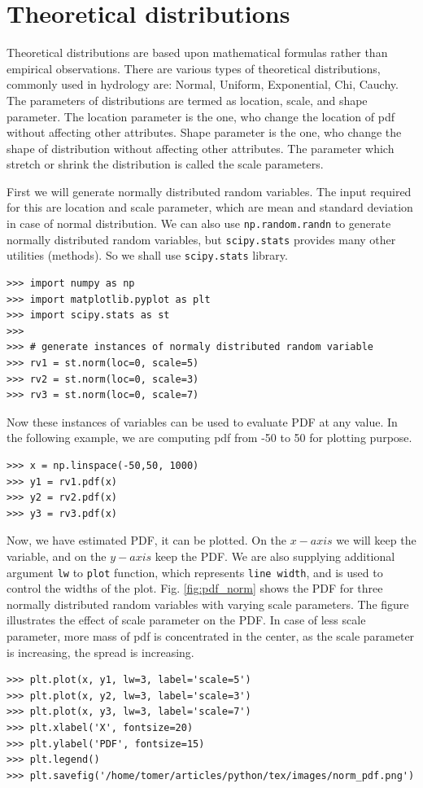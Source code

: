 \documentclass[10pt]{book}
\begin{document}
{\section{Theoretical distributions}
Theoretical distributions are based upon mathematical formulas rather than empirical observations. There are various types of theoretical distributions, commonly used in hydrology are: Normal, Uniform, Exponential, Chi, Cauchy. The parameters of distributions are termed as location, scale, and shape parameter. The location parameter is the one, who change the location of pdf without affecting other attributes. Shape parameter is the one, who change the shape of distribution  without affecting other attributes. The parameter which stretch or shrink the distribution is called the scale parameters. 

First we will generate normally distributed random variables. The input required for this are location and scale parameter, which are mean and standard deviation in case of normal distribution. We can also use \verb"np.random.randn" to generate normally distributed random variables, but \verb"scipy.stats" provides many other utilities (methods). So we shall use \verb"scipy.stats" library. 

\beforeverb \begin{verbatim}
>>> import numpy as np
>>> import matplotlib.pyplot as plt
>>> import scipy.stats as st
>>> 
>>> # generate instances of normaly distributed random variable
>>> rv1 = st.norm(loc=0, scale=5)
>>> rv2 = st.norm(loc=0, scale=3)
>>> rv3 = st.norm(loc=0, scale=7)
\end{verbatim} \afterverb
{}
Now these instances of variables can be used to evaluate PDF at any value. In the following example, we are computing pdf from -50 to 50 for plotting purpose. 

\beforeverb \begin{verbatim}
>>> x = np.linspace(-50,50, 1000)
>>> y1 = rv1.pdf(x)
>>> y2 = rv2.pdf(x)
>>> y3 = rv3.pdf(x)
\end{verbatim} \afterverb

Now, we have estimated PDF, it can be plotted. On the $x-axis$ we will keep the variable, and on the $y-axis$ keep the PDF. We are also supplying additional argument \verb"lw" to \verb"plot" function, which represents \verb"line width", and is used to control the widths of the plot. Fig. \ref{fig:pdf_norm} shows the PDF for three normally distributed random variables with varying scale parameters. The figure illustrates the effect of scale parameter on the PDF. In case of less scale parameter, more mass of pdf is concentrated in the center, as the scale parameter is increasing, the spread is increasing. 
\beforeverb \begin{verbatim}
>>> plt.plot(x, y1, lw=3, label='scale=5')
>>> plt.plot(x, y2, lw=3, label='scale=3')
>>> plt.plot(x, y3, lw=3, label='scale=7')
>>> plt.xlabel('X', fontsize=20)
>>> plt.ylabel('PDF', fontsize=15)
>>> plt.legend()
>>> plt.savefig('/home/tomer/articles/python/tex/images/norm_pdf.png')
\end{verbatim} \afterverb

}
\end{document}
